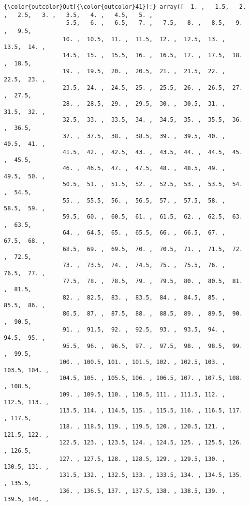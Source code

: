 \documentclass[11pt]{article}
\begin{document}
\begin{Verbatim}[commandchars=\\\{\}]
{\color{outcolor}Out[{\color{outcolor}41}]:} array([  1. ,   1.5,   2. ,   2.5,   3. ,   3.5,   4. ,   4.5,   5. ,
                  5.5,   6. ,   6.5,   7. ,   7.5,   8. ,   8.5,   9. ,   9.5,
                 10. ,  10.5,  11. ,  11.5,  12. ,  12.5,  13. ,  13.5,  14. ,
                 14.5,  15. ,  15.5,  16. ,  16.5,  17. ,  17.5,  18. ,  18.5,
                 19. ,  19.5,  20. ,  20.5,  21. ,  21.5,  22. ,  22.5,  23. ,
                 23.5,  24. ,  24.5,  25. ,  25.5,  26. ,  26.5,  27. ,  27.5,
                 28. ,  28.5,  29. ,  29.5,  30. ,  30.5,  31. ,  31.5,  32. ,
                 32.5,  33. ,  33.5,  34. ,  34.5,  35. ,  35.5,  36. ,  36.5,
                 37. ,  37.5,  38. ,  38.5,  39. ,  39.5,  40. ,  40.5,  41. ,
                 41.5,  42. ,  42.5,  43. ,  43.5,  44. ,  44.5,  45. ,  45.5,
                 46. ,  46.5,  47. ,  47.5,  48. ,  48.5,  49. ,  49.5,  50. ,
                 50.5,  51. ,  51.5,  52. ,  52.5,  53. ,  53.5,  54. ,  54.5,
                 55. ,  55.5,  56. ,  56.5,  57. ,  57.5,  58. ,  58.5,  59. ,
                 59.5,  60. ,  60.5,  61. ,  61.5,  62. ,  62.5,  63. ,  63.5,
                 64. ,  64.5,  65. ,  65.5,  66. ,  66.5,  67. ,  67.5,  68. ,
                 68.5,  69. ,  69.5,  70. ,  70.5,  71. ,  71.5,  72. ,  72.5,
                 73. ,  73.5,  74. ,  74.5,  75. ,  75.5,  76. ,  76.5,  77. ,
                 77.5,  78. ,  78.5,  79. ,  79.5,  80. ,  80.5,  81. ,  81.5,
                 82. ,  82.5,  83. ,  83.5,  84. ,  84.5,  85. ,  85.5,  86. ,
                 86.5,  87. ,  87.5,  88. ,  88.5,  89. ,  89.5,  90. ,  90.5,
                 91. ,  91.5,  92. ,  92.5,  93. ,  93.5,  94. ,  94.5,  95. ,
                 95.5,  96. ,  96.5,  97. ,  97.5,  98. ,  98.5,  99. ,  99.5,
                100. , 100.5, 101. , 101.5, 102. , 102.5, 103. , 103.5, 104. ,
                104.5, 105. , 105.5, 106. , 106.5, 107. , 107.5, 108. , 108.5,
                109. , 109.5, 110. , 110.5, 111. , 111.5, 112. , 112.5, 113. ,
                113.5, 114. , 114.5, 115. , 115.5, 116. , 116.5, 117. , 117.5,
                118. , 118.5, 119. , 119.5, 120. , 120.5, 121. , 121.5, 122. ,
                122.5, 123. , 123.5, 124. , 124.5, 125. , 125.5, 126. , 126.5,
                127. , 127.5, 128. , 128.5, 129. , 129.5, 130. , 130.5, 131. ,
                131.5, 132. , 132.5, 133. , 133.5, 134. , 134.5, 135. , 135.5,
                136. , 136.5, 137. , 137.5, 138. , 138.5, 139. , 139.5, 140. ,

\end{Verbatim}
\end{document}
